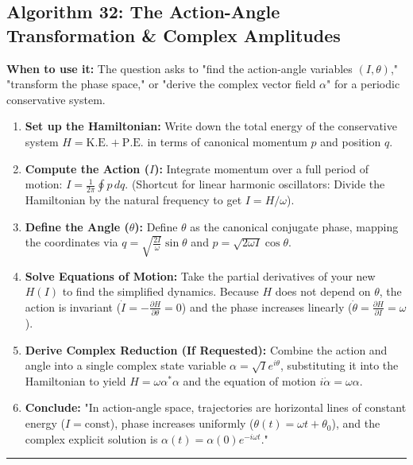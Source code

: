 \documentclass[11pt, a4paper]{report}
\begin{document}
\subsection*{Algorithm 32: The Action-Angle Transformation \& Complex Amplitudes}
\textbf{When to use it:} The question asks to "find the action-angle variables $(I, \theta)$," "transform the phase space," or "derive the complex vector field $\alpha$" for a periodic conservative system.
\begin{enumerate}[label=\textbf{\arabic*.}]
    \item \textbf{Set up the Hamiltonian:} Write down the total energy of the conservative system $H = \text{K.E.} + \text{P.E.}$ in terms of canonical momentum $p$ and position $q$.
    \item \textbf{Compute the Action ($I$):} Integrate momentum over a full period of motion: $I = \frac{1}{2\pi}\oint p \,dq$. (Shortcut for linear harmonic oscillators: Divide the Hamiltonian by the natural frequency to get $I = H/\omega$).
    \item \textbf{Define the Angle ($\theta$):} Define $\theta$ as the canonical conjugate phase, mapping the coordinates via $q = \sqrt{\frac{2I}{\omega}}\sin\theta$ and $p = \sqrt{2\omega I}\cos\theta$.
    \item \textbf{Solve Equations of Motion:} Take the partial derivatives of your new $H(I)$ to find the simplified dynamics. Because $H$ does not depend on $\theta$, the action is invariant ($\dot{I} = -\frac{\partial H}{\partial \theta} = 0$) and the phase increases linearly ($\dot{\theta} = \frac{\partial H}{\partial I} = \omega$).
    \item \textbf{Derive Complex Reduction (If Requested):} Combine the action and angle into a single complex state variable $\alpha = \sqrt{I}e^{i\theta}$, substituting it into the Hamiltonian to yield $H = \omega\alpha^*\alpha$ and the equation of motion $i\dot{\alpha} = \omega\alpha$.
    \item \textbf{Conclude:} "In action-angle space, trajectories are horizontal lines of constant energy ($I = \text{const}$), phase increases uniformly ($\theta(t) = \omega t + \theta_0$), and the complex explicit solution is $\alpha(t) = \alpha(0)e^{-i\omega t}$."
\end{enumerate}
\vspace{1em}
\noindent\rule{\textwidth}{0.4pt}
\vspace{1em}
\end{document}
